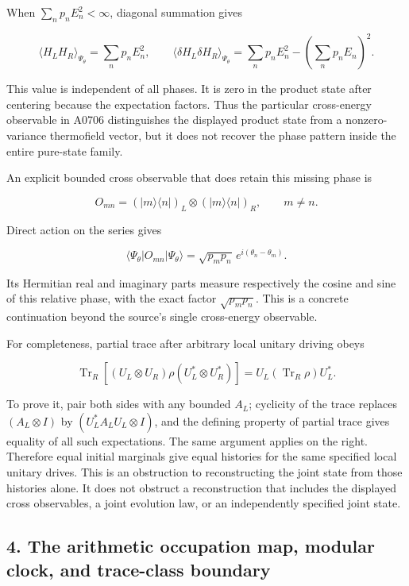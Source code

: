 \documentclass[10pt,a4paper,oneside]{report}
\begin{document}
When \(\sum_n p_nE_n^2<\infty\), diagonal summation gives

\[
\langle H_LH_R\rangle_{\Psi_\theta}=\sum_n p_nE_n^2,
\qquad
\langle\delta H_L\delta H_R\rangle_{\Psi_\theta}
=\sum_n p_nE_n^2-\left(\sum_n p_nE_n\right)^2.
\]

This value is independent of all phases. It is zero in the product state
after centering because the expectation factors. Thus the particular
cross-energy observable in A0706 distinguishes the displayed product
state from a nonzero-variance thermofield vector, but it does not
recover the phase pattern inside the entire pure-state family.

An explicit bounded cross observable that does retain this missing phase
is

\[
O_{mn}=(|m\rangle\langle n|)_L\otimes(|m\rangle\langle n|)_R,
\qquad m\ne n.
\]

Direct action on the series gives

\[
\langle\Psi_\theta|O_{mn}|\Psi_\theta\rangle
=\sqrt{p_mp_n}\,e^{i(\theta_n-\theta_m)}.
\]

Its Hermitian real and imaginary parts measure respectively the cosine
and sine of this relative phase, with the exact factor
\(\sqrt{p_mp_n}\). This is a concrete continuation beyond the source's
single cross-energy observable.

For completeness, partial trace after arbitrary local unitary driving
obeys

\[
\operatorname{Tr}_R[(U_L\otimes U_R)\rho(U_L^*\otimes U_R^*)]
=U_L(\operatorname{Tr}_R\rho)U_L^*.
\]

To prove it, pair both sides with any bounded \(A_L\); cyclicity of the
trace replaces \((A_L\otimes I)\) by \((U_L^*A_LU_L\otimes I)\), and the
defining property of partial trace gives equality of all such
expectations. The same argument applies on the right. Therefore equal
initial marginals give equal histories for the same specified local
unitary drives. This is an obstruction to reconstructing the joint state
from those histories alone. It does not obstruct a reconstruction that
includes the displayed cross observables, a joint evolution law, or an
independently specified joint state.

\subsection{4. The arithmetic occupation map, modular clock, and
trace-class
boundary}\label{proof10:the-arithmetic-occupation-map-modular-clock-and-trace-class-boundary}
\end{document}
